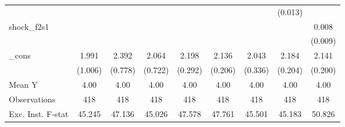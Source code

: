 {\begin{tabular}{l*{8}{c}}
            &                     &                     &                     &                     &                     &                     &     (0.013)         &                     \\
\addlinespace
shock\_f2s1  &                     &                     &                     &                     &                     &                     &                     &       0.008         \\
            &                     &                     &                     &                     &                     &                     &                     &     (0.009)         \\
\addlinespace
\_cons      &       1.991\sym{*}  &       2.392\sym{***}&       2.064\sym{***}&       2.198\sym{***}&       2.136\sym{***}&       2.043\sym{***}&       2.184\sym{***}&       2.141\sym{***}\\
            &     (1.006)         &     (0.778)         &     (0.722)         &     (0.292)         &     (0.206)         &     (0.336)         &     (0.204)         &     (0.200)         \\
\midrule
Mean Y      &        4.00         &        4.00         &        4.00         &        4.00         &        4.00         &        4.00         &        4.00         &        4.00         \\
Observations&         418         &         418         &         418         &         418         &         418         &         418         &         418         &         418         \\
Exc. Inst. F-stat&      45.245         &      47.136         &      45.026         &      47.578         &      47.761         &      45.501         &      45.183         &      50.826         \\
\bottomrule
\end{tabular}
}
